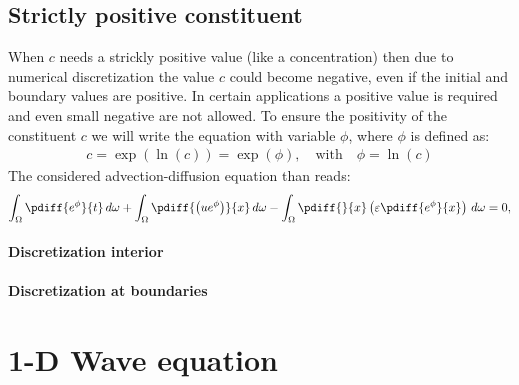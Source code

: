 \subsection{Strictly positive constituent}\label{sec:1d_adv_diff_poss_equation}

When $c$ needs a strickly positive value (like a concentration) then due to numerical discretization the value $c$ could become negative, even if the initial and boundary values are positive.
In certain applications a positive value is required and even small negative are not allowed.
To ensure the positivity of the constituent $c$ we will write the equation with variable $\phi$, where $\phi$ is defined as:
\begin{align}
    c = \exp(\ln(c)) =  \exp(\phi), \quad \text{with} \quad \phi = \ln(c)
\end{align}
The considered advection-diffusion equation than reads:
\begin{align}
    \int_\Omega\pdiff{{e^\phi}}{t} \, d\omega
    + \int_\Omega\pdiff{\left(u{e^\phi}\right)}{x} \, d\omega
    - \int_\Omega\pdiff{}{x}\left(\eps \pdiff{{e^\phi}}{x}\right)\, d\omega = 0,\label{eq:1d_advec_phi}
\end{align}
\paragraph*{Discretization interior}
\notyet
\paragraph*{Discretization at boundaries}
\notyet
\section{1-D Wave equation}

